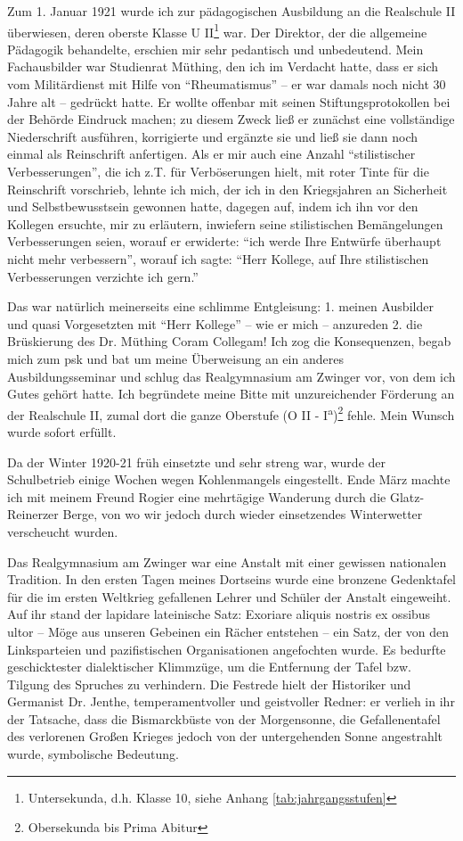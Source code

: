 Zum 1. Januar 1921 wurde ich zur pädagogischen Ausbildung an die Realschule II überwiesen, deren oberste Klasse U II\footnote{Untersekunda, d.h. Klasse 10, siehe Anhang \ref{tab:jahrgangsstufen}} war. Der Direktor, der die allgemeine Pädagogik behandelte, erschien mir sehr pedantisch und unbedeutend. Mein Fachausbilder war Studienrat Müthing, den ich im Verdacht hatte, dass er sich vom Militärdienst mit Hilfe von \enquote{Rheumatismus} -- er war damals noch nicht 30 Jahre alt -- gedrückt hatte. Er wollte offenbar mit seinen Stiftungsprotokollen bei der Behörde Eindruck machen; zu diesem Zweck ließ er zunächst eine vollständige Niederschrift ausführen, korrigierte und ergänzte sie und ließ sie dann noch einmal als Reinschrift anfertigen. Als er mir auch eine Anzahl \enquote{stilistischer Verbesserungen}, die ich z.T. für Verböserungen hielt, mit roter Tinte für die Reinschrift vorschrieb, lehnte ich mich, der ich in den Kriegsjahren an Sicherheit und Selbstbewusstsein gewonnen hatte, dagegen auf, indem ich ihn vor den Kollegen ersuchte, mir zu erläutern, inwiefern seine stilistischen Bemängelungen Verbesserungen seien, worauf er erwiderte: \enquote{ich werde Ihre Entwürfe überhaupt nicht mehr verbessern}, worauf ich sagte: \enquote{Herr Kollege, auf Ihre stilistischen Verbesserungen verzichte ich gern.}

Das war natürlich meinerseits eine schlimme Entgleisung: 1. meinen Ausbilder und quasi Vorgesetzten mit \enquote{Herr Kollege} -- wie er mich -- anzureden 2. die Brüskierung des Dr. Müthing Coram Collegam! Ich zog die Konsequenzen, begab mich zum \ac{psk} und bat um meine Überweisung an ein anderes Ausbildungsseminar und schlug das Realgymnasium am Zwinger vor, von dem ich Gutes gehört hatte. Ich begründete meine Bitte mit unzureichender Förderung an der Realschule II, zumal dort die ganze Oberstufe (O II - I\textsuperscript{a})\footnote{Obersekunda bis Prima Abitur} fehle. Mein Wunsch wurde sofort erfüllt.

Da der Winter 1920-21 früh einsetzte und sehr streng war, wurde der Schulbetrieb einige Wochen wegen Kohlenmangels eingestellt. Ende März machte ich mit meinem Freund Rogier eine mehrtägige Wanderung durch die Glatz-Reinerzer Berge, von wo wir jedoch durch wieder einsetzendes Winterwetter verscheucht wurden.

Das Realgymnasium am Zwinger war eine Anstalt mit einer gewissen nationalen Tradition. In den ersten Tagen meines Dortseins wurde eine bronzene Gedenktafel für die im ersten Weltkrieg gefallenen Lehrer und Schüler der Anstalt eingeweiht. Auf ihr stand der lapidare lateinische Satz: Exoriare aliquis nostris ex ossibus ultor -- Möge aus unseren Gebeinen ein Rächer entstehen -- ein Satz, der von den Linksparteien und pazifistischen Organisationen angefochten wurde. Es bedurfte geschicktester dialektischer Klimmzüge, um die Entfernung der Tafel bzw. Tilgung des Spruches zu verhindern. Die Festrede hielt der Historiker und Germanist Dr. Jenthe, temperamentvoller und geistvoller Redner: er verlieh in ihr der Tatsache, dass die Bismarckbüste von der Morgensonne, die Gefallenentafel des verlorenen Großen Krieges jedoch von der untergehenden Sonne angestrahlt wurde, symbolische Bedeutung.


